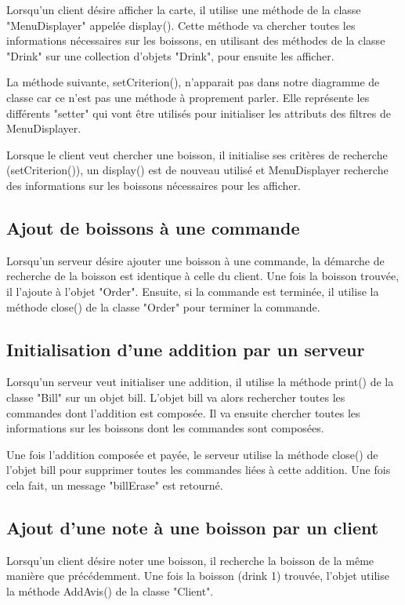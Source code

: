 Lorsqu'un client désire afficher la carte, il utilise une méthode de la classe "MenuDisplayer" appelée display(). Cette méthode va chercher toutes les informations nécessaires sur les boissons, en utilisant des méthodes de la classe "Drink" sur une collection d'objets "Drink", pour ensuite les afficher. 

La méthode suivante, setCriterion(), n'apparait pas dans notre diagramme de classe car ce n'est pas une méthode à proprement parler. Elle représente les différents "setter" qui vont être utilisés pour initialiser les attributs des filtres de MenuDisplayer. 

Lorsque le client veut chercher une boisson, il initialise ses critères de recherche (setCriterion()), un display() est de nouveau utilisé et MenuDisplayer recherche des informations sur les boissons nécessaires pour les afficher. 

\subsection{Ajout de boissons à une commande}

Lorsqu'un serveur désire ajouter une boisson à une commande, la démarche de recherche de la boisson est identique à celle du client. Une fois la boisson trouvée, il l'ajoute à l'objet "Order". Ensuite, si la commande est terminée, il utilise la méthode close() de la classe "Order" pour terminer la commande.


\subsection{Initialisation d'une addition par un serveur}
Lorsqu'un serveur veut initialiser une addition, il utilise la méthode print() de la classe "Bill" sur un objet bill. L'objet bill va alors rechercher toutes les commandes dont l'addition est composée. Il va ensuite chercher toutes les informations sur les boissons dont les commandes sont composées.

Une fois l'addition composée et payée, le serveur utilise la méthode close() de l'objet bill pour supprimer toutes les commandes liées à cette addition. Une fois cela fait, un message "billErase" est retourné.

\subsection{Ajout d'une note à une boisson par un client} 

Lorsqu'un client désire noter une boisson, il recherche la boisson de la même manière que précédemment. Une fois la boisson (drink 1) trouvée, l'objet utilise la méthode AddAvis() de la classe "Client".



